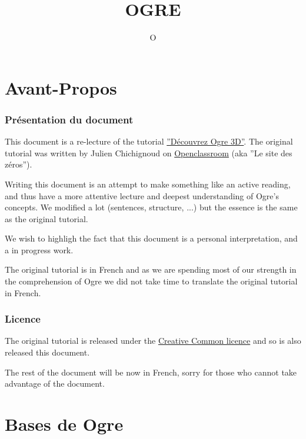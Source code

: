 \documentclass[10pt,a4paper]{report}
\title{OGRE}
\author{O}
\begin{document}
\part*{Avant-Propos}
\section*{Pr\'esentation du document}
This document is a re-lecture of the tutorial \href{http://fr.openclassrooms.com/informatique/cours/decouvrez-ogre-3d}{''D\'ecouvrez Ogre 3D''}. The original tutorial was written by Julien Chichignoud on \href{fr.openclassrooms.com}{Openclassroom} (aka ''Le site des z\'eros'').\newline

Writing this document is an attempt to make something like an active reading, and thus have a more attentive lecture and deepest understanding of Ogre's concepts. We modified a lot (sentences, structure, ...) but the essence is the same as the original tutorial.\newline

We wish to highligh the fact that this document is a personal interpretation, and a in progress work.\newline

The original tutorial is in French and as we are spending most of our strength in the comprehension of Ogre we did not take time to translate the original tutorial in French.\newline


\section*{Licence}
The original tutorial is released under the 
\href{http://creativecommons.org/licenses/by-nc-sa/2.0/}{Creative Common licence} and so is also released this document.\newline

The rest of the document will be now in French, sorry for those who cannot take advantage of the document.


\part{Bases de Ogre}




\end{document}
